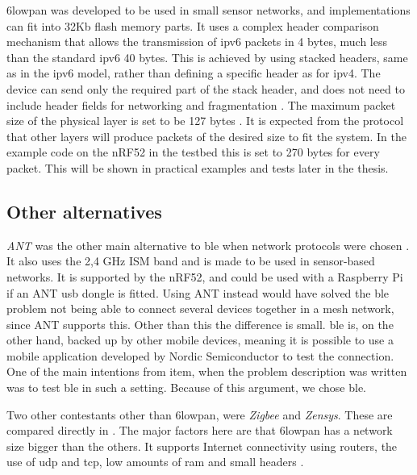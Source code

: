 \noindent \gls{6lowpan} was developed to be used in small sensor networks, and implementations can fit into 32Kb flash memory parts. It uses a complex header comparison mechanism that allows the transmission of \gls{ipv6} packets in 4 bytes, much less than the standard \gls{ipv6} 40 bytes. This is achieved by using stacked headers, same as in the \gls{ipv6} model, rather than defining a specific header as for \gls{ipv4}. The device can send only the required part of the stack header, and does not need to include header fields for networking and fragmentation \cite{hui2008extending}. The maximum packet size of the physical layer is set to be 127 bytes \cite{kushalnagar2007transmission}. It is expected from the protocol that other layers will produce packets of the desired size to fit the system. In the example code on the nRF52 in the testbed this is set to 270 bytes for every packet. This will be shown in practical examples and tests later in the thesis. 

\subsection{Other alternatives} \label{otherAlternatives}

\noindent \textit{ANT} was the other main alternative to \gls{ble} when network protocols were chosen \cite{ant23}. It also uses the 2,4 GHz ISM band and is made to be used in sensor-based networks. It is supported by the \gls{nRF52}, and could be used with a \gls{Raspberry Pi} if an ANT \gls{usb} dongle is fitted. Using ANT instead would have solved the \gls{ble} problem not being able to connect several devices together in a mesh network, since ANT supports this. Other than this the difference is small. \gls{ble} is, on the other hand, backed up by other mobile devices, meaning it is possible to use a mobile application developed by Nordic Semiconductor to test the connection. One of the main intentions from \gls{item}, when the problem description was written was to test \gls{ble} in such a setting. Because of this argument, we chose \gls{ble}. 



\noindent Two other contestants other than \gls{6lowpan}, were \textit{Zigbee} and \textit{Zensys}. These are compared directly in \cite{mulligan20076lowpan}. The major factors here are that \gls{6lowpan} has a network size bigger than the others. It supports Internet connectivity using routers, the use of \gls{udp} and \gls{tcp}, low amounts of \gls{ram} and small headers \cite{mulligan20076lowpan}. 


